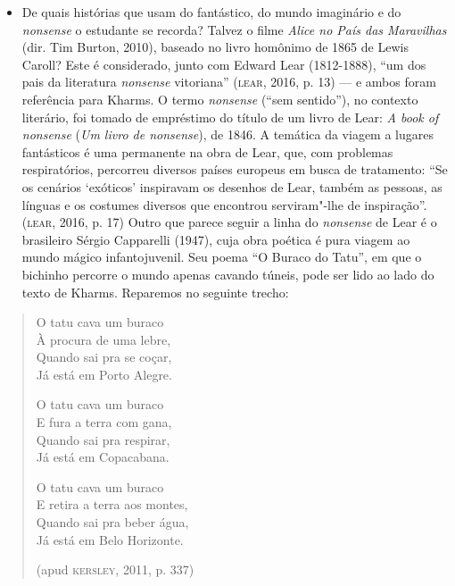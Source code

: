\documentclass[11pt]{extarticle}
\begin{document}
\begin{itemize}
\item De quais histórias que usam do fantástico, do mundo imaginário e do
\emph{nonsense} o estudante se recorda? Talvez o filme \emph{Alice no
País das Maravilhas} (dir. Tim Burton, 2010), baseado no livro homônimo
de 1865 de Lewis Caroll? Este é considerado, junto com Edward Lear
(1812-1888), ``um dos pais da literatura \emph{nonsense} vitoriana''
(\textsc{lear}, 2016, p. 13) --- e ambos foram referência para Kharms. O termo
\emph{nonsense} (``sem sentido''), no contexto literário, foi tomado de
empréstimo do título de um livro de Lear: \emph{A book of nonsense}
(\emph{Um livro de nonsense}), de 1846. A temática da viagem a lugares
fantásticos é uma permanente na obra de Lear, que, com problemas
respiratórios, percorreu diversos países europeus em busca de
tratamento: ``Se os cenários `exóticos' inspiravam os desenhos de Lear,
também as pessoas, as línguas e os costumes diversos que encontrou
serviram"-lhe de inspiração''. (\textsc{lear}, 2016, p. 17) Outro que parece
seguir a linha do \emph{nonsense} de Lear é o brasileiro Sérgio
Capparelli (1947), cuja obra poética é pura viagem ao mundo mágico
infantojuvenil. Seu poema ``O Buraco do Tatu'', em que o bichinho
percorre o mundo apenas cavando túneis, pode ser lido ao lado do texto
de Kharms. Reparemos no seguinte trecho:
\end{itemize}

\begin{verse}
O tatu cava um buraco\\
À procura de uma lebre,\\
Quando sai pra se coçar,\\
Já está em Porto Alegre.

O tatu cava um buraco\\
E fura a terra com gana,\\
Quando sai pra respirar,\\
Já está em Copacabana.

O tatu cava um buraco\\
E retira a terra aos montes,\\
Quando sai pra beber água,\\
Já está em Belo Horizonte.

(apud \textsc{kersley}, 2011, p. 337)

\end{verse}

\end{document}
